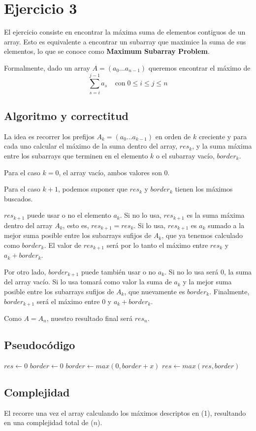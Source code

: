 \section{Ejercicio 3}

El ejercicio consiste en encontrar la máxima suma de elementos contiguos de un array.
Esto es equivalente a encontrar un subarray que maximice la suma de sus elementos,
lo que se conoce como \textbf{Maximum Subarray Problem}.


Formalmente, dado un array $A = (a_0 \ldots a_{n-1})$ queremos encontrar el máximo de
$$
\sum_{s=i}^{j-1} a_s \;\;\;\; \text{con} \; 0 \leq i \leq j \leq n
$$


\subsection{Algoritmo y correctitud}

La idea es recorrer los prefijos $A_k = (a_0 \ldots a_{k-1})$ en orden de $k$ creciente
y para cada uno calcular el máximo de la suma dentro del array, $res_k$,
y la suma máxima entre los subarrays que terminen en el elemento $k$ o el subarray vacío, $border_k$.

Para el caso $k=0$, el array vacío, ambos valores son 0.

Para el caso $k+1$, podemos suponer que $res_k$ y $border_k$ tienen los máximos buscados.

$res_{k+1}$ puede usar o no el elemento $a_k$. Si no lo usa, $res_{k+1}$ es la suma máxima dentro del array $A_k$, esto es, $res_{k+1} = res_k$. Si lo usa, $res_{k+1}$ es $a_k$ sumado a la mejor suma posible entre los subarrays sufijos de $A_k$, que ya tenemos calculado como $border_k$. El valor de $res_{k+1}$ será por lo tanto el máximo entre $res_k$ y $a_k + border_k$.

Por otro lado, $border_{k+1}$ puede también usar o no $a_k$. Si no lo usa será $0$, la suma del array vacío. Si lo usa tomará como valor la suma de $a_k$ y la mejor suma posible entre los subarrays sufijos de $A_k$, que nuevamente es $border_k$. Finalmente, $border_{k+1}$ será el máximo entre $0$ y $a_k + border_k$.

Como $A = A_n$, nuestro resultado final será $res_n$.

\subsection{Pseudocódigo}

\begin{algorithmic}

    \State $res \gets 0$
    \State $border \gets 0$
        \State $border \gets max(0, border+x)$
        \State $res \gets max(res, border)$
    \EndFor
    \State {}
\EndFunction

\end{algorithmic}

\subsection{Complejidad}

El recorre una vez el array calculando los máximos descriptos en \bigo(1), resultando en una complejidad total de \bigo($n$).

